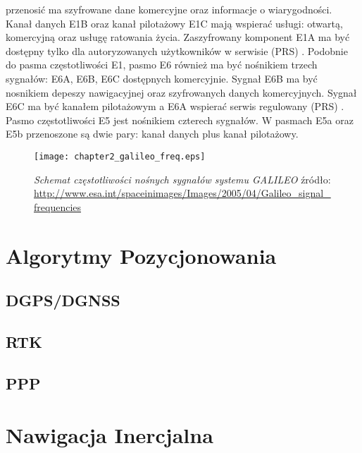 przenosić ma szyfrowane dane komercyjne oraz informacje o wiarygodności. Kanał danych E1B oraz kanał pilotażowy E1C mają wspierać usługi: otwartą, komercyjną oraz 
usługę ratowania życia. Zaszyfrowany komponent E1A ma być dostępny tylko dla autoryzowanych użytkowników w serwisie (PRS) \cite[][strona 387]{hofmann_gnss}.
Podobnie do pasma częstotliwości E1, pasmo E6 również ma być nośnikiem trzech sygnałów: E6A, E6B, E6C dostępnych komercyjnie. 
Sygnał E6B ma być nosnikiem depeszy nawigacyjnej oraz szyfrowanych danych komercyjnych. Sygnał E6C ma być kanałem pilotażowym a E6A wspierać serwis regulowany (PRS)
\cite[][strona 389]{hofmann_gnss}.
Pasmo częstotliwości E5 jest nośnikiem czterech sygnałów. W pasmach E5a oraz E5b przenoszone są dwie pary: kanał danych plus kanał pilotażowy.
\begin{figure}[H]
\centering
\texttt{[image: chapter2\_galileo\_freq.eps]}
\caption{\textit{Schemat częstotliwości nośnych sygnałów systemu GALILEO} źródło: \protect\url{http://www.esa.int/spaceinimages/Images/2005/04/Galileo_signal_frequencies}}
\label{fig:galileo_freq}
\end{figure}
\section{Algorytmy Pozycjonowania}

	\subsection{DGPS/DGNSS}
	\subsection{RTK}
	\subsection{PPP}
\section{Nawigacja Inercjalna}
